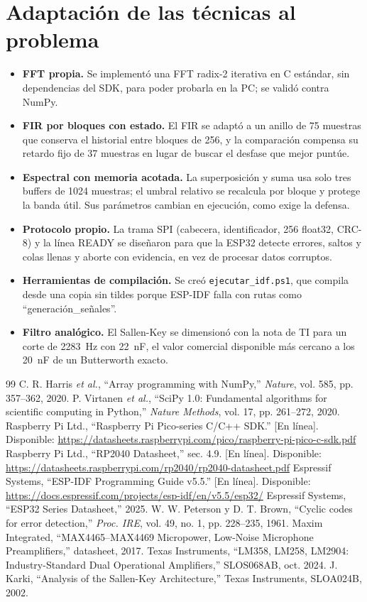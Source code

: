 \documentclass[10pt,a4paper]{article}
\begin{document}
\section{Adaptación de las técnicas al problema}
\begin{itemize}
\item \textbf{FFT propia.} Se implementó una FFT radix-2 iterativa en C estándar, sin
dependencias del SDK, para poder probarla en la PC; se validó contra NumPy.
\item \textbf{FIR por bloques con estado.} El FIR se adaptó a un anillo de 75 muestras
que conserva el historial entre bloques de 256, y la comparación compensa su retardo
fijo de 37 muestras en lugar de buscar el desfase que mejor puntúe.
\item \textbf{Espectral con memoria acotada.} La superposición y suma usa solo tres
buffers de 1024 muestras; el umbral relativo se recalcula por bloque y protege la banda
útil. Sus parámetros cambian en ejecución, como exige la defensa.
\item \textbf{Protocolo propio.} La trama SPI (cabecera, identificador, 256 float32,
CRC-8) y la línea READY se diseñaron para que la ESP32 detecte errores, saltos y colas
llenas y aborte con evidencia, en vez de procesar datos corruptos.
\item \textbf{Herramientas de compilación.} Se creó \texttt{ejecutar\_idf.ps1}, que
compila desde una copia sin tildes porque ESP-IDF falla con rutas como
``generación\_señales''.
\item \textbf{Filtro analógico.} El Sallen-Key se dimensionó con la nota de TI para un
corte de 2283~Hz con 22~nF, el valor comercial disponible más cercano a los 20~nF de un Butterworth exacto.
\end{itemize}

{\small
\begin{thebibliography}{99}
 C. R. Harris \emph{et al.}, ``Array programming with NumPy,'' \emph{Nature}, vol. 585, pp. 357--362, 2020.
 P. Virtanen \emph{et al.}, ``SciPy 1.0: Fundamental algorithms for scientific computing in Python,'' \emph{Nature Methods}, vol. 17, pp. 261--272, 2020.
 Raspberry Pi Ltd., ``Raspberry Pi Pico-series C/C++ SDK.'' [En línea]. Disponible: \url{https://datasheets.raspberrypi.com/pico/raspberry-pi-pico-c-sdk.pdf}
 Raspberry Pi Ltd., ``RP2040 Datasheet,'' sec. 4.9. [En línea]. Disponible: \url{https://datasheets.raspberrypi.com/rp2040/rp2040-datasheet.pdf}
 Espressif Systems, ``ESP-IDF Programming Guide v5.5.'' [En línea]. Disponible: \url{https://docs.espressif.com/projects/esp-idf/en/v5.5/esp32/}
 Espressif Systems, ``ESP32 Series Datasheet,'' 2025.
 W. W. Peterson y D. T. Brown, ``Cyclic codes for error detection,'' \emph{Proc. IRE}, vol. 49, no. 1, pp. 228--235, 1961.
 Maxim Integrated, ``MAX4465--MAX4469 Micropower, Low-Noise Microphone Preamplifiers,'' datasheet, 2017.
 Texas Instruments, ``LM358, LM258, LM2904: Industry-Standard Dual Operational Amplifiers,'' SLOS068AB, oct. 2024.
 J. Karki, ``Analysis of the Sallen-Key Architecture,'' Texas Instruments, SLOA024B, 2002.
\end{thebibliography}}
\end{document}
